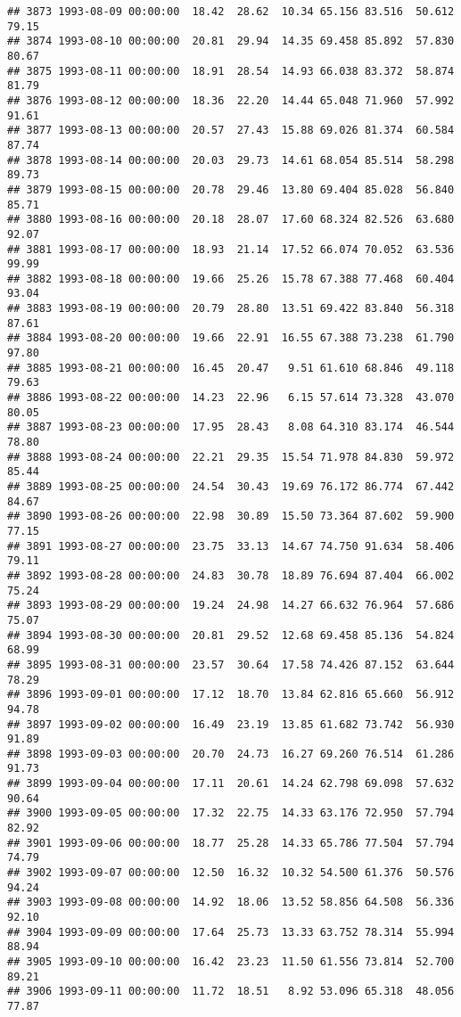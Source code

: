 \documentclass{article}\usepackage{graphicx, color}
\makeatletter
\newenvironment{kframe}{%
 \def\at@end@of@kframe{}%
 \ifinner\ifhmode%
  \def\at@end@of@kframe{\end{minipage}}%
  \begin{minipage}{\columnwidth}%
 \fi\fi%
 \def\FrameCommand##1{\hskip\@totalleftmargin \hskip-\fboxsep
 \colorbox{shadecolor}{##1}\hskip-\fboxsep
     \hskip-\linewidth \hskip-\@totalleftmargin \hskip\columnwidth}%
 \MakeFramed {\advance\hsize-\width
   \@totalleftmargin\z@ \linewidth\hsize
   \@setminipage}}%
 {\par\unskip\endMakeFramed%
 \at@end@of@kframe}
\newenvironment{knitrout}{}{} %
\makeatother
\begin{document}
\begin{knitrout}
\begin{kframe}
\begin{verbatim}
## 3873 1993-08-09 00:00:00  18.42  28.62  10.34 65.156 83.516  50.612  79.15
## 3874 1993-08-10 00:00:00  20.81  29.94  14.35 69.458 85.892  57.830  80.67
## 3875 1993-08-11 00:00:00  18.91  28.54  14.93 66.038 83.372  58.874  81.79
## 3876 1993-08-12 00:00:00  18.36  22.20  14.44 65.048 71.960  57.992  91.61
## 3877 1993-08-13 00:00:00  20.57  27.43  15.88 69.026 81.374  60.584  87.74
## 3878 1993-08-14 00:00:00  20.03  29.73  14.61 68.054 85.514  58.298  89.73
## 3879 1993-08-15 00:00:00  20.78  29.46  13.80 69.404 85.028  56.840  85.71
## 3880 1993-08-16 00:00:00  20.18  28.07  17.60 68.324 82.526  63.680  92.07
## 3881 1993-08-17 00:00:00  18.93  21.14  17.52 66.074 70.052  63.536  99.99
## 3882 1993-08-18 00:00:00  19.66  25.26  15.78 67.388 77.468  60.404  93.04
## 3883 1993-08-19 00:00:00  20.79  28.80  13.51 69.422 83.840  56.318  87.61
## 3884 1993-08-20 00:00:00  19.66  22.91  16.55 67.388 73.238  61.790  97.80
## 3885 1993-08-21 00:00:00  16.45  20.47   9.51 61.610 68.846  49.118  79.63
## 3886 1993-08-22 00:00:00  14.23  22.96   6.15 57.614 73.328  43.070  80.05
## 3887 1993-08-23 00:00:00  17.95  28.43   8.08 64.310 83.174  46.544  78.80
## 3888 1993-08-24 00:00:00  22.21  29.35  15.54 71.978 84.830  59.972  85.44
## 3889 1993-08-25 00:00:00  24.54  30.43  19.69 76.172 86.774  67.442  84.67
## 3890 1993-08-26 00:00:00  22.98  30.89  15.50 73.364 87.602  59.900  77.15
## 3891 1993-08-27 00:00:00  23.75  33.13  14.67 74.750 91.634  58.406  79.11
## 3892 1993-08-28 00:00:00  24.83  30.78  18.89 76.694 87.404  66.002  75.24
## 3893 1993-08-29 00:00:00  19.24  24.98  14.27 66.632 76.964  57.686  75.07
## 3894 1993-08-30 00:00:00  20.81  29.52  12.68 69.458 85.136  54.824  68.99
## 3895 1993-08-31 00:00:00  23.57  30.64  17.58 74.426 87.152  63.644  78.29
## 3896 1993-09-01 00:00:00  17.12  18.70  13.84 62.816 65.660  56.912  94.78
## 3897 1993-09-02 00:00:00  16.49  23.19  13.85 61.682 73.742  56.930  91.89
## 3898 1993-09-03 00:00:00  20.70  24.73  16.27 69.260 76.514  61.286  91.73
## 3899 1993-09-04 00:00:00  17.11  20.61  14.24 62.798 69.098  57.632  90.64
## 3900 1993-09-05 00:00:00  17.32  22.75  14.33 63.176 72.950  57.794  82.92
## 3901 1993-09-06 00:00:00  18.77  25.28  14.33 65.786 77.504  57.794  74.79
## 3902 1993-09-07 00:00:00  12.50  16.32  10.32 54.500 61.376  50.576  94.24
## 3903 1993-09-08 00:00:00  14.92  18.06  13.52 58.856 64.508  56.336  92.10
## 3904 1993-09-09 00:00:00  17.64  25.73  13.33 63.752 78.314  55.994  88.94
## 3905 1993-09-10 00:00:00  16.42  23.23  11.50 61.556 73.814  52.700  89.21
## 3906 1993-09-11 00:00:00  11.72  18.51   8.92 53.096 65.318  48.056  77.87

\end{verbatim}
\end{kframe}
\end{knitrout}
\end{document}
